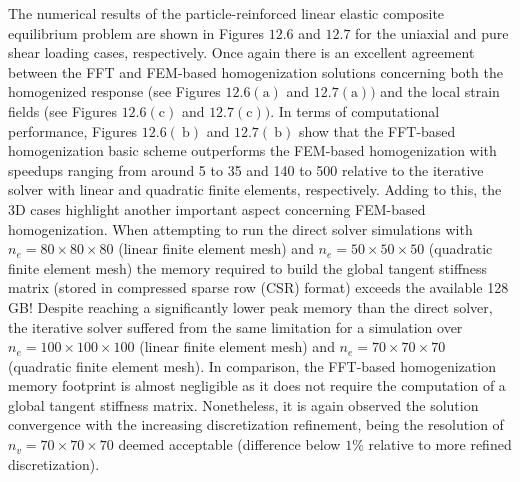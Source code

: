 The numerical results of the particle-reinforced linear elastic composite equilibrium problem are shown in Figures \(12.6\) and \(12.7\) for the uniaxial and pure shear loading cases, respectively.
Once again there is an excellent agreement between the FFT and FEM-based homogenization solutions concerning both the homogenized response (see Figures \(12.6(\mathrm{a})\) and \(12.7(\mathrm{a}))\) and the local strain fields (see Figures \(12.6(\mathrm{c})\) and \(12.7(\mathrm{c})) .\)
In terms of computational performance, Figures \(12.6(\mathrm{~b})\) and \(12.7(\mathrm{~b})\) show that the FFT-based homogenization basic scheme outperforms the FEM-based homogenization with speedups ranging from around 5 to 35 and 140 to 500 relative to the iterative solver with linear and quadratic finite elements, respectively.
Adding to this, the 3D cases highlight another important aspect concerning FEM-based homogenization. When attempting to run the direct solver simulations with \(n_{e}=80 \times 80 \times 80\) (linear finite element mesh) and \(n_{e}=50 \times 50 \times 50\) (quadratic finite element mesh) the memory required to build the global tangent stiffness matrix (stored in compressed sparse row (CSR) format) exceeds the available 128 GB!
Despite reaching a significantly lower peak memory than the direct solver, the iterative solver suffered from the same limitation for a simulation over \(n_{e}=100 \times 100 \times 100\) (linear finite element mesh) and \(n_{e}=70 \times 70 \times 70\) (quadratic finite element mesh).
In comparison, the FFT-based homogenization memory footprint is almost negligible as it does not require the computation of a global tangent stiffness matrix.
Nonetheless, it is again observed the solution convergence with the increasing discretization refinement, being the resolution of \(n_{v}=70 \times 70 \times 70\) deemed acceptable (difference below \(1 \%\) relative to more refined discretization).

